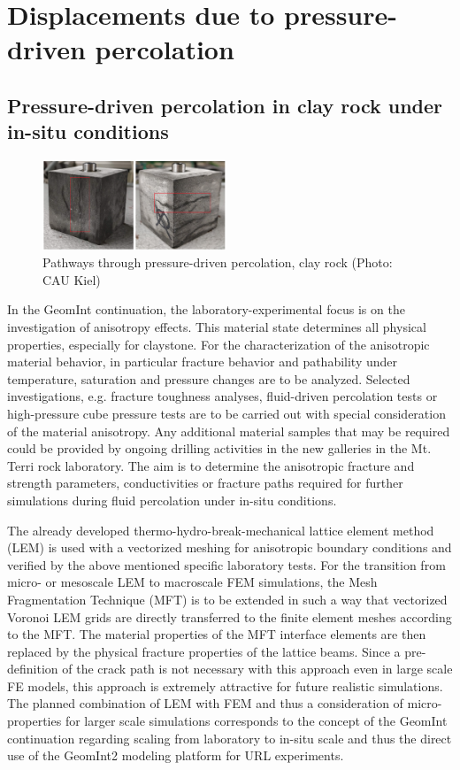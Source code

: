 \section{Displacements due to pressure-driven percolation}

\subsection{Pressure-driven percolation in clay rock under in-situ conditions}

\begin{figure}
\vspace{-5mm}
\centering
\includegraphics[width=0.49\textwidth]{figures/GeomInt_AP2_CAU}
\caption{Pathways through pressure-driven percolation, clay rock (Photo: CAU Kiel)}
\label{fig:cd-a}
\end{figure}
In the GeomInt continuation, the laboratory-experimental focus is on the investigation of anisotropy effects. This material state determines all physical properties, especially for claystone. For the characterization of the anisotropic material behavior, in particular fracture behavior and pathability under temperature, saturation and pressure changes are to be analyzed. Selected investigations, e.g. fracture toughness analyses, fluid-driven percolation tests or high-pressure cube pressure tests are to be carried out with special consideration of the material anisotropy. Any additional material samples that may be required could be provided by ongoing drilling activities in the new galleries in the Mt. Terri rock laboratory. The aim is to determine the anisotropic fracture and strength parameters, conductivities or fracture paths required for further simulations during fluid percolation under in-situ conditions.

The already developed thermo-hydro-break-mechanical lattice element method (LEM) is used with a vectorized meshing for anisotropic boundary conditions and verified by the above mentioned specific laboratory tests. 
%
For the transition from micro- or mesoscale LEM to macroscale FEM simulations, the \glqq Mesh Fragmentation Technique (MFT)\grqq{} is to be extended in such a way that vectorized Voronoi LEM grids are directly transferred to the finite element meshes according to the MFT. The material properties of the MFT interface elements are then replaced by the physical fracture properties of the lattice beams. Since a pre-definition of the crack path is not necessary with this approach even in large scale FE models, this approach is extremely attractive for future realistic simulations.
%
The planned combination of LEM with FEM and thus a consideration of micro-properties for larger scale simulations corresponds to the concept of the GeomInt continuation regarding scaling from laboratory to in-situ scale and thus the direct use of the GeomInt2 modeling platform for URL experiments.

